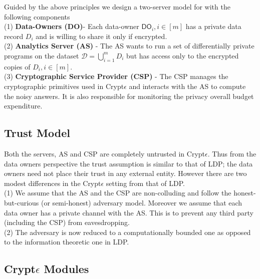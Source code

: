 Guided by the above principles we design a two-server model for \system with the following components
\\(1)\textbf{ Data-Owners (\textsf{DO})}-  Each data-owner $\textsf{DO}_i, i \in [m]$ has  a
private data record $D_i$ and is willing to share it only if encrypted.   \\(2)\textbf{ Analytics Server (\textsf{AS})} - The \textsf{AS} wants to run a set of differentially private programs on the dataset $\mathcal{D}=\bigcup_{i=1}^m D_i$  but has 
access only to the encrypted copies of $D_i, i \in [m]$.
\\(3)\textbf{ Cryptographic Service Provider (\textsf{CSP})} -
 The \textsf{CSP} manages the cryptographic primitives used in Crypt$\epsilon$ and interacts with the \textsf{AS} to compute the
noisy answers. It is also responsible for monitoring the privacy overall budget expenditure.
\subsection{Trust Model}
Both the servers, \textsf{AS} and \textsf{CSP} are completely untrusted in Crypt$\epsilon$. 
Thus from the data owners perspective the trust assumption is similar to that of \textsf{LDP}; the data owners need not place their trust in any external entity. 
However there are two modest differences in the Crypt$\epsilon$ setting from that of \textsf{LDP}.\\
 (1) We assume that the \textsf{AS} and the \textsf{CSP} are non-colluding and follow the honest-but-curious (or semi-honest) adversary model. %
 Moreover we assume that each data owner has a private channel with the \textsf{AS}. This is to prevent any third party (including the \textsf{CSP}) from eavesdropping. \\
 (2) The adversary is now reduced to a computationally bounded one as opposed to the information theoretic one  in \textsf{LDP}.
\subsection{Crypt$\epsilon$ Modules}

